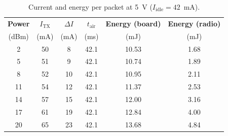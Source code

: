 \documentclass[informe,english]{plantilla}
\begin{document}
\begin{table}[h]
    \centering
    \begin{tabular}{@{}cccccc@{}}
        \toprule
        \textbf{Power} & $I_{\text{TX}}$ & $\Delta I$ & $t_{\text{air}}$ &
        \textbf{Energy (board)} & \textbf{Energy (radio)} \\
        (dBm) & (mA) & (mA) & (ms) & (mJ) & (mJ) \\
        \midrule
        2       & 50  & 8   & 42.1 & 10.53 & 1.68 \\
        5       & 51  & 9   & 42.1 & 10.74 & 1.89 \\
        8  & 52  & 10  & 42.1 & 10.95 & 2.11 \\
        11 & 54  & 12  & 42.1 & 11.37 & 2.53 \\
        14 & 57  & 15  & 42.1 & 12.00 & 3.16 \\
        17 & 61  & 19  & 42.1 & 12.84 & 4.00 \\
        20 & 65  & 23  & 42.1 & 13.68 & 4.84 \\
        \bottomrule
    \end{tabular}
    \caption{Current and energy per packet at 5~V ($I_{\text{idle}} = 42$~mA).}
    \label{tab:energy}
\end{table}
\end{document}
